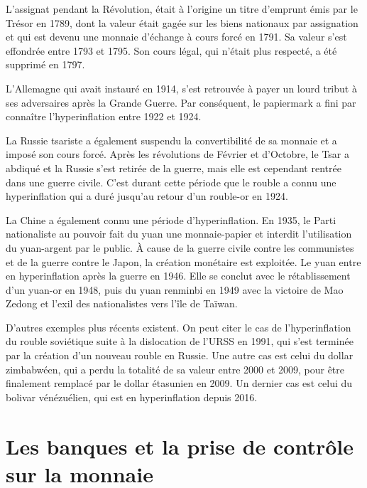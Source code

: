 L'assignat pendant la Révolution, était à l'origine un titre d'emprunt émis par le Trésor en 1789, dont la valeur était gagée sur les biens nationaux par assignation et qui est devenu une monnaie d'échange à cours forcé en 1791. Sa valeur s'est effondrée entre 1793 et 1795. Son cours légal, qui n'était plus respecté, a été supprimé en 1797.

L'Allemagne qui avait instauré  en 1914, s'est retrouvée à payer un lourd tribut à ses adversaires après la Grande Guerre. Par conséquent, le papiermark a fini par connaître l'hyperinflation entre 1922 et 1924.

La Russie tsariste a également suspendu la convertibilité de sa monnaie et a imposé son cours forcé. Après les révolutions de Février et d'Octobre, le Tsar a abdiqué et la Russie s'est retirée de la guerre, mais elle est cependant rentrée dans une guerre civile. C'est durant cette période que le rouble a connu une hyperinflation qui a duré jusqu'au retour d'un rouble-or en 1924.

La Chine a également connu une période d'hyperinflation. En 1935, le Parti nationaliste au pouvoir fait du yuan une monnaie-papier et interdit l'utilisation du yuan-argent par le public. À cause de la guerre civile contre les communistes et de la guerre contre le Japon, la création monétaire est exploitée. Le yuan entre en hyperinflation après la guerre en 1946. Elle se conclut avec le rétablissement d'un yuan-or en 1948, puis du yuan renminbi en 1949 avec la victoire de Mao Zedong et l'exil des nationalistes vers l'île de Taïwan.

D'autres exemples plus récents existent. On peut citer le cas de l'hyperinflation du rouble soviétique suite à la dislocation de l'URSS en 1991, qui s'est terminée par la création d'un nouveau rouble en Russie. Une autre cas est celui du dollar zimbabwéen, qui a perdu la totalité de sa valeur entre 2000 et 2009, pour être finalement remplacé par le dollar étasunien en 2009. Un dernier cas est celui du bolivar vénézuélien, qui est en hyperinflation depuis 2016.

\section{Les banques et la prise de contrôle sur la monnaie}

